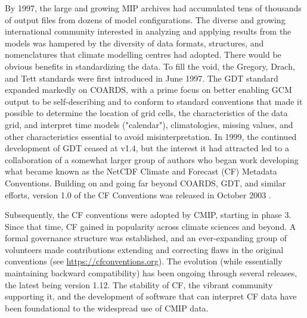 \documentclass[gmd, preprint]{copernicus}
\newcommand{\mycomment}[1]{}
\begin{document}
By 1997, the large and growing MIP archives had accumulated tens of thousands of output files from dozens of model configurations. The diverse and growing international community interested in analyzing and applying results from the models was hampered by the diversity of data formats, structures, and nomenclatures that climate modelling centres had adopted. There would be obvious benefits in standardizing the data. To fill the void, the Gregory, Drach, and Tett \citep[GDT v0;][]{gregory_gdt_1999} standards were first introduced in June 1997. The GDT standard expanded markedly on COARDS, with a prime focus on better enabling GCM output to be self-describing and to conform to standard conventions that made it possible to determine the location of grid cells, the characteristics of the data grid, and interpret time models ("calendar"), climatologies, missing values, and other characteristics essential to avoid misinterpretation. In 1999, the continued development of GDT ceased at v1.4, but the interest it had attracted led to a collaboration of a somewhat larger group of authors who began work developing what became known as the NetCDF Climate and Forecast (CF) Metadata Conventions. Building on and going far beyond COARDS, GDT, and similar efforts, version 1.0 of the CF Conventions was released in October 2003 \citep{eaton_netcdf_2024}.  

Subsequently, the CF conventions were adopted by CMIP, starting in phase 3. Since that time, CF gained in popularity across climate sciences and beyond. A formal governance structure was established, and an ever-expanding group of volunteers made contributions extending and correcting flaws in the original conventions (see \url{https://cfconventions.org}). The evolution (while essentially maintaining backward compatibility) has been ongoing through several releases, the latest being version 1.12. The stability of CF, the vibrant community supporting it, and the development of software that can interpret CF data have been foundational to the widespread use of CMIP data. 

\mycomment{
https://www.unidata.ucar.edu/software/netcdf/conventions.html
https://www.unidata.ucar.edu/software/netcdf/coords/proposals.html
COARDS 1995 - https://web.archive.org/web/20100527095818/http://ferret.wrc.noaa.gov/noaa_coop/coop_cdf_profile.html
GDT 1997
https://www.unidata.ucar.edu/mailing_lists/archives/netcdfgroup/1997/msg00080.html
https://www.unidata.ucar.edu/software/netcdf/coords/0054.html 1997
https://web.archive.org/web/20100610102527/http://www-pcmdi.llnl.gov/drach/GDT_convention.html 1999
https://web.archive.org/web/20040604041414/http://www-pcmdi.llnl.gov/drach/netCDF.html
CF 2003 - https://cfconventions.org/Data/cf-conventions/cf-conventions-1.11/cf-conventions.html#_version_1_0_28_october_2003 
}
\end{document}
